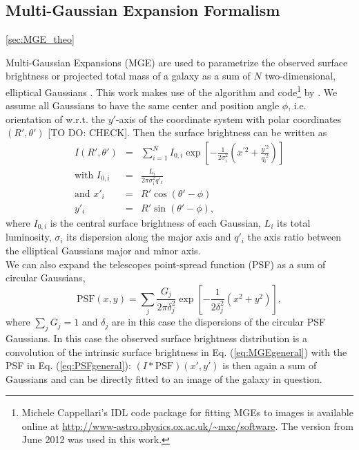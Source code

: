 \subsection{Multi-Gaussian Expansion Formalism} \ref{sec:MGE_theo}

Multi-Gaussian Expansions (MGE) are used to parametrize the observed surface brightness or projected total mass of a galaxy as a sum of $N$ two-dimensional, elliptical Gaussians \citep{1991ApJ...366..599B,1992A&A...253..366M,1994A&A...285..723E,1999MNRAS.303..495E}. This work makes use of the algorithm and code\footnote{Michele Cappellari's IDL code package for fitting MGEs to images is available online at \url{http://www-astro.physics.ox.ac.uk/~mxc/software}. The version from June 2012 was used in this work.} by \citet{Cap02}. We assume all Gaussians to have the same center and position angle $\phi$, i.e. orientation of w.r.t. the $y'$-axis of the coordinate system with polar coordinates $(R',\theta')$ [TO DO: CHECK]. Then the surface brightness can be written as
\begin{eqnarray}
I(R',\theta') &=& \sum_{i=1}^{N} I_{0,i} \exp\left[ - \frac{1}{2\sigma_i^2} \left(x^{'2} + \frac{y^{'2}}{q_i^{'2}}\right)\right]\label{eq:MGEgeneral}\\
\text{with } I_{0,i} &=& \frac{L_i}{2\pi \sigma_i^2 q'_i}\label{eq:centralItotalL}\\
\text{and } x'_i &=& R' \cos(\theta' - \phi)\nonumber\\
y'_i &=& R' \sin(\theta' - \phi),\nonumber
\end{eqnarray}
where $I_{0,i}$ is the central surface brightness of each Gaussian, $L_i$ its total luminosity, $\sigma_i$ its dispersion along the major axis and $q'_i$ the axis ratio between the elliptical Gaussians major and minor axis.
\\We can also expand the telescopes point-spread function (PSF) as a sum of circular Gaussians,
\begin{equation}
\text{PSF}(x,y) = \sum_j \frac{G_j}{2 \pi \delta_j^2} \exp\left[- \frac{1}{2 \delta_j^2} \left(x^2 + y^2 \right)\right], \label{eq:PSFgeneral}
\end{equation}
where $\sum_j G_j = 1$ and $\delta_j$ are in this case the dispersions of the circular PSF Gaussians. In this case the observed surface brightness distribution is a convolution of the intrinsic surface brightness in Eq. (\ref{eq:MGEgeneral}) with the PSF in Eq. (\ref{eq:PSFgeneral}): $(I \ast \text{PSF}) (x',y')$ is then again a sum of Gaussians and can be directly fitted to an image of the galaxy in question.

